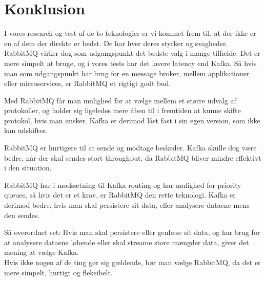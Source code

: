 \documentclass[
]{article}
\begin{document}
\hypertarget{konklusion}{%
\section{Konklusion}\label{konklusion}}

I vores research og test af de to teknologier er vi kommet frem til, at
der ikke er en af dem der direkte er bedst. De har hver deres styrker og
svagheder.\\
RabbitMQ virker dog som udgangspunkt det bedste valg i mange tilfælde.
Det er mere simpelt at bruge, og i vores tests har det lavere latency
end Kafka. Så hvis man som udgangspunkt har brug for en message broker,
mellem applikationer eller microservices, er RabbitMQ et rigtigt godt
bud.

Med RabbitMQ får man mulighed for at vælge mellem et større udvalg af
protokoller, og holder sig ligeledes mere åben til i fremtiden at kunne
skifte protokol, hvis man ønsker. Kafka er derimod låst fast i sin egen
version, som ikke kan udskiftes.

RabbitMQ er hurtigere til at sende og modtage beskeder. Kafka skulle dog
være bedre, når der skal sendes stort throughput, da RabbitMQ bliver
mindre effektivt i den situation.

RabbitMQ har i modsætning til Kafka routing og har mulighed for priority
queues, så hvis det er et krav, er RabbitMQ den rette teknologi. Kafka
er derimod bedre, hvis man skal persistere sit data, eller analysere
dataene mens den sendes.

Så overordnet set: Hvis man skal persistere eller genlæse sit data, og
har brug for at analysere dataene løbende eller skal streame store
mængder data, giver det mening at vælge Kafka.\\
Hvis ikke nogen af de ting gør sig gældende, bør man vælge RabbitMQ, da
det er mere simpelt, hurtigt og fleksibelt.
\pagebreak

\end{document}
